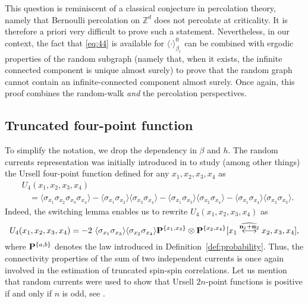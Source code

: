 \documentclass[a4paper,oneside,11pt]{article}
\newcommand{\ee}{\end{equation}}
\newcommand{\be}{\begin{equation}}
\begin{document}
This question is reminiscent of a classical conjecture in percolation theory, namely that Bernoulli percolation on $\mathbb Z^d$ does not percolate at criticality. It is therefore a priori very difficult to prove such a statement. Nevertheless,
in our context, the fact that \eqref{eq:44} is available for $\langle \cdot\rangle_{\beta_c}^0$ can be combined with ergodic properties of the random subgraph (namely that, when it exists, the infinite connected component is unique almost surely) to prove that the random graph cannot contain an infinite-connected component almost surely. Once again, this proof combines the random-walk {\em and} the percolation perspectives.

\subsection{Truncated four-point function}\label{sec:4} To simplify the notation, we drop the dependency in $\beta$ and $h$. The random currents representation was initially introduced in \cite{Aiz82} to study (among other things) the Ursell four-point function defined for any $x_1,x_2,x_3,x_4$ as
\begin{align*}
&U_4(x_1,x_2,x_3,x_4)\\
&\ \ \ \ =\langle\sigma_{x_1}\sigma_{x_2}\sigma_{x_3}\sigma_{x_4}\rangle-\langle\sigma_{x_1}\sigma_{x_2}\rangle\langle\sigma_{x_3}\sigma_{x_4}\rangle-\langle\sigma_{x_1}\sigma_{x_3}\rangle\langle\sigma_{x_2}\sigma_{x_4}\rangle-\langle\sigma_{x_1}\sigma_{x_4}\rangle\langle\sigma_{x_2}\sigma_{x_3}\rangle.
\end{align*}
Indeed, the switching lemma enables us to rewrite $U_4(x_1,x_2,x_3,x_4)$ as
\be \label{eq:Ursell}
U_4(x_1,x_2,x_3,x_4)=-2\ \langle \sigma_{x_1}\sigma_{x_3}\rangle\langle \sigma_{x_2}\sigma_{x_4}\rangle{\bf P}^{\{x_1,x_3\}}\otimes{\bf P}^{\{x_2,x_4\}}[x_1\lr[\widehat{{\mathbf n}_1+{\mathbf n} _2}]x_2,x_3,x_4],\ee
where ${\bf P}^{\{a,b\}}$ denotes the law introduced in Definition~\ref{def:probability}.
Thus, the connectivity properties of the sum of two independent currents is once again involved in the estimation of truncated spin-spin correlations. Let us mention that random currents were used to show that Ursell $2n$-point functions is positive if and only if $n$ is odd, see \cite{Shl86}.
\end{document}
